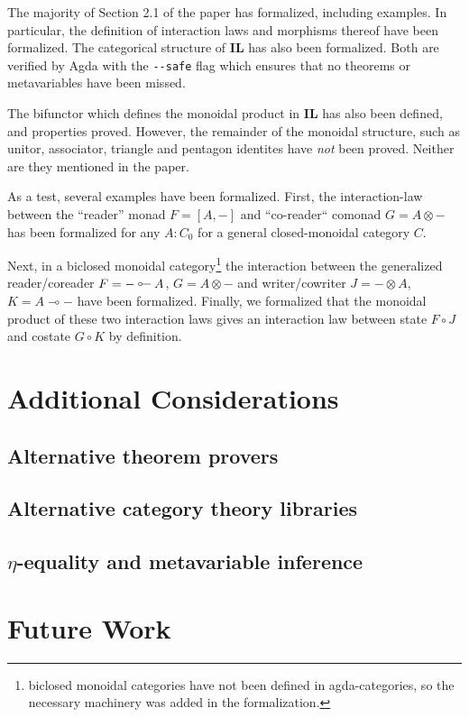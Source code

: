 \documentclass{amsart}
\newcommand{\multimapinv}{\mathbin{\mathpalette\rotmmap\relax}}
\newcommand{\rotmmap}[2]{\rotatebox[origin=c]{180}{$#1\multimap$}}
\theoremstyle{remark}
\begin{document}
The majority of Section 2.1 of the paper has formalized, including examples. In particular, the definition of interaction laws and morphisms thereof have been formalized. The categorical structure of $\mathbf{IL}$ has also been formalized. Both are verified by Agda with the \verb|--safe| flag which ensures that no theorems or metavariables have been missed. 

The bifunctor which defines the monoidal product in $\mathbf{IL}$ has also been defined, and properties proved. However, the remainder of the monoidal structure, such as unitor, associator, triangle and pentagon identites have \emph{not} been proved. Neither are they mentioned in the paper.

As a test, several examples have been formalized. First, the interaction-law between the ``reader'' monad $F=[A, -]$ and ``co-reader`` comonad $G=A\otimes -$ has been formalized for any $A : C_0$ for a general closed-monoidal category $C$.

Next, in a biclosed monoidal category\footnote{biclosed monoidal categories have not been defined in agda-categories\cite{agda:categories}, so the necessary machinery was added in the formalization.}
the interaction between the generalized reader/coreader $F=-\multimapinv A$, $G=A\otimes -$ and writer/cowriter $J=-\otimes A$, $K=A\multimap -$ have been formalized. Finally, we formalized that the monoidal product of these two interaction laws gives an interaction law between state $F\circ J$ and costate $G\circ K$ by definition.


\section{Additional Considerations}

\subsection{Alternative theorem provers}

\subsection{Alternative category theory libraries}

\subsection{$\eta$-equality and metavariable inference}

\section{Future Work}

\printbibliography
\end{document}
